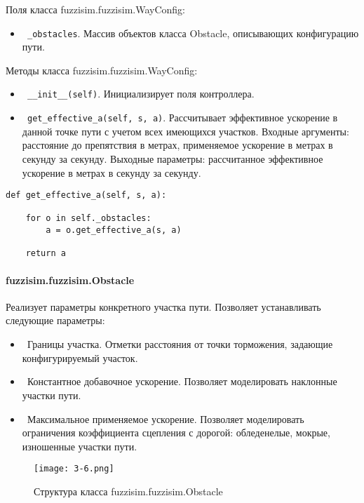 Поля класса fuzzisim.fuzzisim.WayConfig:
\begin{itemize}
	\item \lstinline! _obstacles!. Массив объектов класса Obstacle, описывающих конфигурацию пути.
\end{itemize}
Методы класса fuzzisim.fuzzisim.WayConfig:
\begin{itemize}
	\item \lstinline! __init__(self)!. Инициализирует поля контроллера.
	\item \lstinline! get_effective_a(self, s, a)!.  Рассчитывает эффективное ускорение в данной точке пути с учетом всех имеющихся участков. Входные аргументы: расстояние до препятствия в метрах, применяемое ускорение в метрах в секунду за секунду. Выходные параметры: рассчитанное эффективное ускорение в метрах в секунду за секунду.
\end{itemize}

\begin{lstlisting}[style=pythonstyle,caption={  }, label=lst:func:1]
def get_effective_a(self, s, a):

	for o in self._obstacles:
		a = o.get_effective_a(s, a)

	return a
\end{lstlisting}




\paragraph{fuzzisim.fuzzisim.Obstacle}

Реализует параметры конкретного участка пути. Позволяет устанавливать следующие параметры:
\begin{itemize}
	\item \lstinline! !Границы участка. Отметки расстояния от точки торможения, задающие конфигурируемый участок.
	\item \lstinline! !Константное добавочное ускорение. Позволяет моделировать наклонные участки пути.
	\item \lstinline! !Максимальное применяемое ускорение. Позволяет моделировать ограничения коэффициента сцепления с дорогой: обледенелые, мокрые, изношенные участки пути.
\end{itemize}

\begin{figure}[ht]
	\centering
	\texttt{[image: 3-6.png]}
	\caption{ Структура класса fuzzisim.fuzzisim.Obstacle}
\end{figure}

